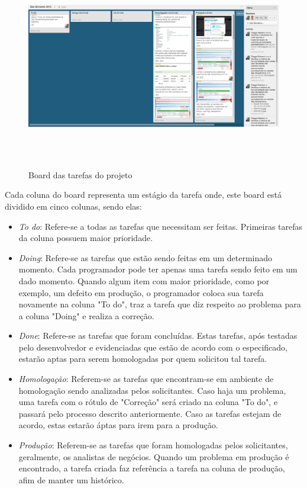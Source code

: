 \documentclass[11pt, a4paper]{article}
\begin{document}
\begin{figure}[H]
  \caption{Board das tarefas do projeto}
  \centering 
  \includegraphics[width=160mm,height=90mm]{images/board.png}
\end{figure}

Cada coluna do board representa um estágio da tarefa onde, este board está dividido em cinco colunas, sendo elas:

\begin{itemize}
	\item \textit{To do}: Refere-se a todas as tarefas que necessitam ser feitas. Primeiras tarefas da coluna possuem maior prioridade.
	\item \textit{Doing}: Refere-se as tarefas que estão sendo feitas em um determinado momento. Cada programador pode ter apenas uma tarefa sendo feito em um dado momento. Quando algum item com maior prioridade, como por exemplo, um defeito em produção, o programador coloca sua tarefa novamente na coluna "To do", traz a tarefa que diz respeito ao problema para a coluna "Doing" e realiza a correção.
	\item \textit{Done}: Refere-se as tarefas que foram concluídas. Estas tarefas, após testadas pelo desenvolvedor e evidenciadas que estão de acordo com o especificado, estarão aptas para serem homologadas por quem solicitou tal tarefa.
	\item \textit{Homologação}: Referem-se as tarefas que encontram-se em ambiente de homologação sendo analizadas pelos solicitantes. Caso haja um problema, uma tarefa com o rótulo de "Correção" será criado na coluna "To do", e passará pelo processo descrito anteriormente. Caso as tarefas estejam de acordo, estas estarão áptas para irem para a produção.
	\item \textit{Produção}: Referem-se as tarefas que foram homologadas pelos solicitantes, geralmente, os analistas de negócios. Quando um problema em produção é encontrado, a tarefa criada faz referência a tarefa na coluna de produção, afim de manter um histórico.
\end{itemize}
\end{document}
